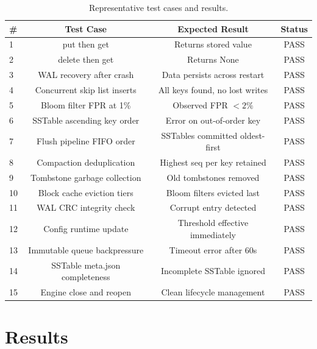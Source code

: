 \documentclass[oneside,a4paper,12pt]{book}
\begin{document}
\begin{table}[H]
\centering
\renewcommand{\arraystretch}{1.2}
\begin{tabularx}{\textwidth}{|X|c|c|c|}
\hline
\textbf{\#} & \textbf{Test Case} & \textbf{Expected Result} & \textbf{Status} \\
\hline
1 & put then get & Returns stored value & PASS \\
\hline
2 & delete then get & Returns None & PASS \\
\hline
3 & WAL recovery after crash & Data persists across restart & PASS \\
\hline
4 & Concurrent skip list inserts & All keys found, no lost writes & PASS \\
\hline
5 & Bloom filter FPR at 1\% & Observed FPR $< 2\%$ & PASS \\
\hline
6 & SSTable ascending key order & Error on out-of-order key & PASS \\
\hline
7 & Flush pipeline FIFO order & SSTables committed oldest-first & PASS \\
\hline
8 & Compaction deduplication & Highest seq per key retained & PASS \\
\hline
9 & Tombstone garbage collection & Old tombstones removed & PASS \\
\hline
10 & Block cache eviction tiers & Bloom filters evicted last & PASS \\
\hline
11 & WAL CRC integrity check & Corrupt entry detected & PASS \\
\hline
12 & Config runtime update & Threshold effective immediately & PASS \\
\hline
13 & Immutable queue backpressure & Timeout error after 60s & PASS \\
\hline
14 & SSTable meta.json completeness & Incomplete SSTable ignored & PASS \\
\hline
15 & Engine close and reopen & Clean lifecycle management & PASS \\
\hline
\end{tabularx}
\caption{Representative test cases and results.}
\label{tab:testcases}
\end{table}


\chapter{Results}
\end{document}
